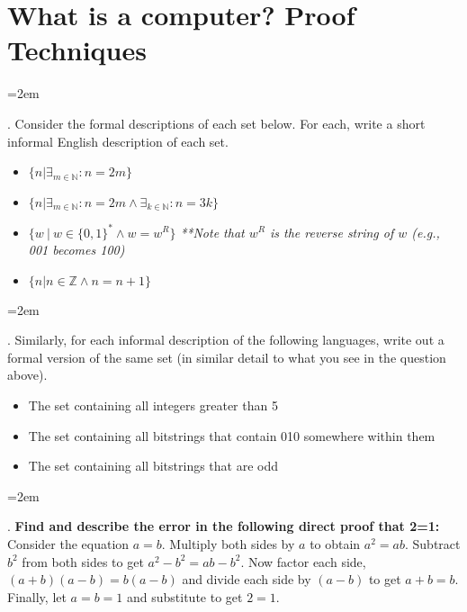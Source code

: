 \documentclass[12pt]{article}
\def\homework{What is a computer? Proof Techniques}
\newcounter{quesnum}
\newcommand{\question}[2][??]{
\begin{list}{\labelitemi}{\leftmargin=2em}
\item [\arabic{quesnum}.] {} {#2}
\end{list}
\addtocounter{quesnum}{1}
}
\begin{document}
\section*{\homework}

\question[3]{
Consider the formal descriptions of each set below. For each, write a short informal English description of each set.
}

\begin{itemize}
	\item $\{n | \exists_{m \in \mathbb{N}} : n=2m\}$ 
	\item $\{n | \exists_{m \in \mathbb{N}} : n=2m \wedge \exists_{k \in \mathbb{N}} : n=3k \}$ 
	\item $\{ w \ | \ w \in \{0,1\}^* \wedge w=w^R \}$ \emph{**Note that $w^R$ is the reverse string of $w$ (e.g., 001 becomes 100)}
	\item $\{ n | n \in \mathbb{Z} \wedge n=n+1 \}$
\end{itemize}

\vspace{12pt}

\question[3]{
Similarly, for each informal description of the following languages, write out a formal version of the same set (in similar detail to what you see in the question above).
}

\begin{itemize}
	\item The set containing all integers greater than 5
	\item The set containing all bitstrings that contain 010 somewhere within them
	\item The set containing all bitstrings that are odd
\end{itemize}

\vspace{12pt}

\question[3]{
\textbf{Find and describe the error in the following direct proof that 2=1:} Consider the equation $a=b$. Multiply both sides by $a$ to obtain $a^2=ab$. Subtract $b^2$ from both sides to get $a^2-b^2=ab-b^2$. Now factor each side, $(a+b)(a-b)=b(a-b)$ and divide each side by $(a-b)$ to get $a+b=b$. Finally, let $a=b=1$ and substitute to get $2=1$.
}

\vspace{12pt}
\end{document}
